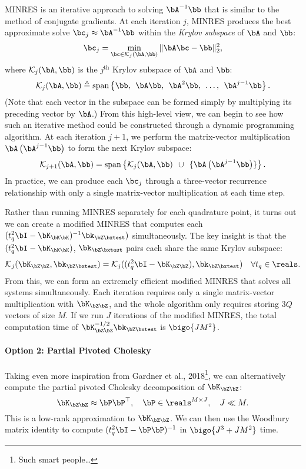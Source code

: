MINRES  is an iterative approach to solving $\bA^{-1} \bb$ that is similar to the method of conjugate gradients.
At each iteration $j$, MINRES produces the best approximate solve $\bc_j \approx \bA^{-1} \bb$ within the \emph{Krylov subspace} of $\bA$ and $\bb$:
%
\[ \bc_j = \min_{\bc \in \mathcal{K}_j (\bA, \bb)} \Vert \bA \bc - \bb \Vert_2^2, \]
%
where $\mathcal{K}_j (\bA, \bb)$ is the $j^\text{th}$ Krylov subspace of $\bA$ and $\bb$:
%
\begin{equation}
  \mathcal{K}_j (\bA, \bb) \triangleq
  \text{span} \left\{
    \bb, \:\: \bA \bb, \:\: \bA^2 \bb, \:\: \ldots, \:\: \bA^{j-1} \bb
  \right\}.
\end{equation}
%
(Note that each vector in the subspace can be formed simply by multiplying its preceding vector by $\bA$.)
From this high-level view, we can begin to see how such an iterative method could be constructed through a dynamic programming algorithm.
At each iteration $j+1$, we perform the matrix-vector multiplication $\bA \left( \bA^{j-1} \bb \right)$ to form the next Krylov subspace:
%
\[ \mathcal{K}_{j+1} (\bA, \bb) = \text{span} \left\{ \mathcal{K}_{j} (\bA, \bb) \:\: \cup \:\: \{ \bA \left( \bA^{j-1} \bb \right) \} \right\}.  \]
%
In practice, we can produce each $\bc_j$ through a three-vector recurrence relationship with only a single matrix-vector multiplication at each time step.

Rather than running MINRES separately for each quadrature point, it turns out we can create a modified MINRES that computes each $( t_q^2 \bI - \bK_{\bK\bK})^{-1} \bk_{\bZ \bxtest} )$ simultaneously.
The key insight is that the $(t_q^2 \bI - \bK_{\bK\bK})$, $\bk_{\bZ \bxtest}$ pairs each share the same Krylov subspace:
\[
  \mathcal{K}_j (\bK_{\bZ\bZ}, \bk_{\bZ\bxtest}) =
  \mathcal{K}_j ((t_q^2 \bI - \bK_{\bZ\bZ}), \bk_{\bZ\bxtest}) \quad \forall t_q \in \reals.
\]
From this, we can form an extremely efficient modified MINRES that solves all systems simultaneously.
Each iteration requires only a single matrix-vector multiplication with $\bK_{\bZ\bZ}$, and the whole algorithm only requires storing $3Q$ vectors of size $M$.
If we run $J$ iterations of the modified MINRES, the total computation time of $\bK_{\bZ\bZ}^{-1/2} \bk_{\bZ\bxtest}$ is $\bigo{J M^2}$.

\paragraph{Option 2: Partial Pivoted Cholesky}

Taking even more inspiration from Gardner et al., 2018\footnote{
  Such smart people\ldots
}, we can alternatively compute the partial pivoted Cholesky decomposition of $\bK_{\bZ\bZ}$:
%
\begin{equation}
  \bK_{\bZ\bZ} \approx \bP \bP^\top, \quad \bP \in \reals^{M \times J}, \quad J \ll M.
  \label{eqn:partial_pc}
\end{equation}
%
This is a low-rank approximation to $\bK_{\bZ\bZ}$.
We can then use the Woodbury matrix identity to compute $( t_q^2 \bI - \bP \bP )^{-1}$ in $\bigo{ J^3 + J M^2 }$ time.
